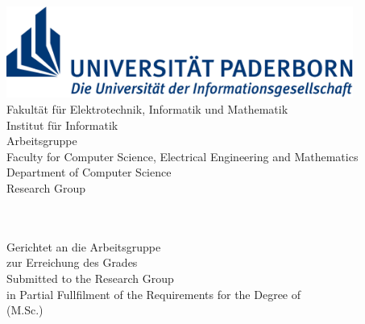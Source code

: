 \begin{titlepage}
	\begin{center}
		\begin{minipage}{135mm}
			\includegraphics[height=30mm]{figures/uni-logo}\\
			\ifgerman
				\textsf{
					\hspace*{20mm} Fakultät für Elektrotechnik,
					Informatik und Mathematik \\
					\hspace*{20mm} Institut für Informatik \\
					\hspace*{20mm} Arbeitsgruppe \theresearchgroup{} \\
				}
			\else
				\textsf{
					\hspace*{20mm} Faculty for Computer Science, 
					Electrical Engineering and Mathematics \\
					\hspace*{20mm} Department of Computer Science \\
					\hspace*{20mm} Research Group \theresearchgroup{} \\
				}
			\fi 
		\end{minipage}\\[40pt]

		{\huge \thethesistype{}}\\[5pt]
		\ifgerman
			Gerichtet an die Arbeitsgruppe \theresearchgroup{}\\
			zur Erreichung des Grades\\[5pt]
		\else
			Submitted to the \theresearchgroup{} Research Group\\
			in Partial Fullfilment of the Requirements
			for the Degree of\\[5pt]
		\fi 
		{\huge \thedegree{} (M.Sc.)}\\[30pt]

		{\Huge\textbf{\thetitle{}}}\\[30pt]


\end{center}
\end{titlepage}
